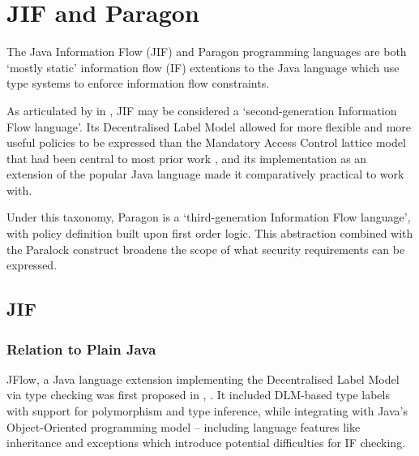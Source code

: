 \chapter{JIF and Paragon} \label{intro_to_jif_para}

The Java Information Flow (JIF) and Paragon programming languages are both `mostly static' information flow (IF) extentions to the Java language which use type systems to enforce information flow constraints.

As articulated by \citeauthor{broberg2013paragon} in  \cite{broberg2013paragon}, JIF may be considered a `second-generation Information Flow language'. Its Decentralised Label Model allowed for more flexible and more useful policies to be expressed than the Mandatory Access Control lattice model that had been central to most prior work \cite{denning1977certification}, and its implementation as an extension of the popular Java language made it comparatively practical to work with.

Under this taxonomy, Paragon is a `third-generation Information Flow language', with policy definition built upon first order logic. This abstraction combined with the Paralock construct broadens the scope of what security requirements can be expressed.


\newpage

\section{JIF}

\subsection{Relation to Plain Java}

JFlow, a Java language extension implementing the Decentralised Label Model via type checking was first proposed in , \cite{myers1999jflow}. It included DLM-based type labels with support for polymorphism and type inference, while integrating with Java's Object-Oriented programming model -- including language features like inheritance and exceptions which introduce potential difficulties for IF checking.

